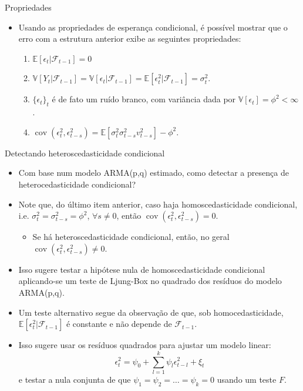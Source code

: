 \documentclass[11pt]{beamer}
\begin{document}
\begin{frame}{Propriedades }
\begin{itemize}
	\item Usando as propriedades de esperança condicional, é possível mostrar que o erro com a estrutura anterior exibe as seguintes propriedades:
	\begin{enumerate}
		\item $\mathbb{E}[\epsilon_t|\mathcal{F}_{t-1}] = 0$
		\item $\mathbb{V}[Y_t|\mathcal{F}_{t-1}]  = \mathbb{V}[\epsilon_t|\mathcal{F}_{t-1}] = \mathbb{E}[\epsilon_t^2|\mathcal{F}_{t-1}] = \sigma^2_t$.
		\item $\{\epsilon_t\}_t$ é de fato um ruído branco, com variância dada por $\mathbb{V}[\epsilon_t] = \phi^2 < \infty$. 
		\item $\operatorname{cov}(\epsilon_t^2, \epsilon_{t-s}^2) =\mathbb{E}[\sigma^2_t \sigma^2_{t-s} v_{t-s}^2] -  \phi^2$.
	\end{enumerate}
\end{itemize}
\end{frame}


\begin{frame}{Detectando heteroscedasticidade condicional}
\begin{itemize}
	\item Com base num modelo ARMA(p,q) estimado, como detectar a presença de heterocedasticidade condicional?
	\item Note que, do último item anterior, caso haja homoscedasticidade condicional, i.e. $\sigma^2_t=\sigma^2_{t-s} = \phi^2$, $\forall s \neq 0$, então $\operatorname{cov}(\epsilon_t^2, \epsilon_{t-s}^2)= 0$.
	\begin{itemize}
		\item Se há heteroscedasticidade condicional, então, no geral $\operatorname{cov}(\epsilon_t^2, \epsilon_{t-s}^2) \neq 0$.
	\end{itemize}
	\item Isso sugere testar a hipótese nula de homoscedasticidade condicional aplicando-se um {\color{blue}teste de Ljung-Box no quadrado dos resíduos} do modelo ARMA(p,q).
	\item Um teste alternativo segue da observação de que, sob homocedasticidade, $\mathbb{E}[\epsilon_t^2|\mathcal{F}_{t-1}]$ é constante e não depende de $\mathcal{F}_{t-1}$.
	\item Isso sugere usar os resíduos quadrados para ajustar um modelo linear:
	$$ \epsilon_t^2  = \psi_0 + \sum_{l=1}^k \psi_l \epsilon_{t-l}^2 + \xi_t$$
	e testar a nula  conjunta de que $\psi_1 = \psi_2 =\ldots = \psi_k=0$ usando um teste $F$.
\end{itemize}
\end{frame}
\end{document}
